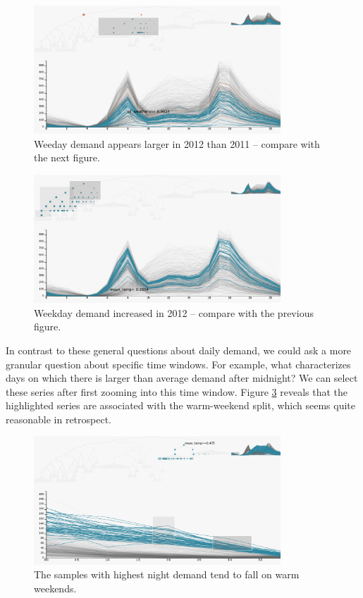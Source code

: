 \documentclass[12pt]{article}
\begin{document}
\begin{figure}

{\centering \includegraphics[width=350px]{figure/weekday_2011}

}

\caption{Weeday demand appears larger in 2012 than 2011 -- compare with the next figure.}\label{fig:weekday2011}
\end{figure}

\begin{figure}

{\centering \includegraphics[width=350px]{figure/weekday_2012}

}

\caption{Weekday demand increased in 2012 -- compare with the previous figure.}\label{fig:weekday2012}
\end{figure}

In contrast to these general questions about daily demand, we could ask
a more granular question about specific time windows. For example, what
characterizes days on which there is larger than average demand after
midnight? We can select these series after first zooming into this time window.
Figure \ref{fig:warmweekend} reveals that the highlighted series are associated
with the warm-weekend split, which seems quite reasonable in retrospect.

\begin{figure}

{\centering \includegraphics[width=350px]{figure/warm_weekend}

}

\caption{The samples with highest night demand tend to fall on warm weekends.}\label{fig:warmweekend}
\end{figure}
\end{document}
